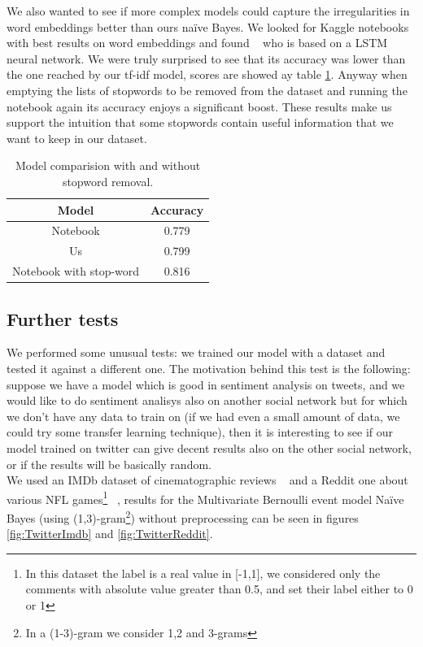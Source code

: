 We also wanted to see if more complex models could capture the irregularities in word embeddings better than ours na\"ive Bayes. 
We looked for Kaggle notebooks with best results on word embeddings and found ~\cite{startups:notebook2} who is based on a LSTM neural network.
We were truly surprised to see that its accuracy was lower than the one reached by our tf-idf model, scores are showed ay table \ref{tab:versus_metrics_FT}. 
Anyway when emptying the lists of stopwords to be removed from the dataset and running the notebook again its accuracy enjoys a significant boost. 
These results make us support the intuition that some stopwords contain useful information that we want to keep in our dataset. 

\begin{table}[h!t]
    \centering
    \caption{Model comparision with and without stopword removal.}
    \label{tab:versus_metrics_FT}
    \begin{tabular}{c|c}
        \hline
        Model & Accuracy\\
        \hline 
        Notebook & 0.779 \\ 
        Us & 0.799 \\ 
        Notebook with stop-word & 0.816 \\ 
        \hline
    \end{tabular}
\end{table}

\subsection*{Further tests}
We performed some unusual tests: we trained our model with a dataset and tested it against a different one. The motivation behind this test is the following: suppose we have a model which is good in sentiment analysis on tweets, and we would like to do sentiment analisys also on another social network but for which we don't have any data to train on (if we had even a small amount of data, we could try some transfer learning technique), then it is interesting to see if our model trained on twitter can give decent results also on the other social network, or if the results will be basically random.\\
We used an IMDb dataset of cinematographic reviews ~\cite{data:imdb} and a Reddit one about various NFL games\footnote{In this dataset the label is a real value in [-1,1], we considered only the comments with absolute value greater than 0.5, and set their label either to 0 or 1} ~\cite{data:reddit}, results for the Multivariate Bernoulli event model Na\"ive Bayes (using (1,3)-gram\footnote{In a (1-3)-gram we consider 1,2 and 3-grams}) without preprocessing can be seen in figures \ref{fig:TwitterImdb} and \ref{fig:TwitterReddit}.

